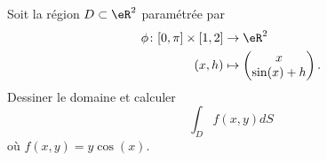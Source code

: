 
\begin{exercice}\label{exoOutilsMath-0115}

    Soit la région $D\subset\eR^2$ paramétrée par
    \begin{equation}
        \begin{aligned}
            \phi\colon \mathopen[ 0 , \pi \mathclose]\times\mathopen[ 1 , 2 \mathclose]&\to \eR^2 \\
            (x,h)&\mapsto \begin{pmatrix}
                x    \\ 
                \sin(x)+h    
            \end{pmatrix}.
        \end{aligned}
    \end{equation}
    Dessiner le domaine et calculer
    \begin{equation}
        \int_D f(x,y)dS
    \end{equation}
    où $f(x,y)=y\cos(x)$.

\end{exercice}

